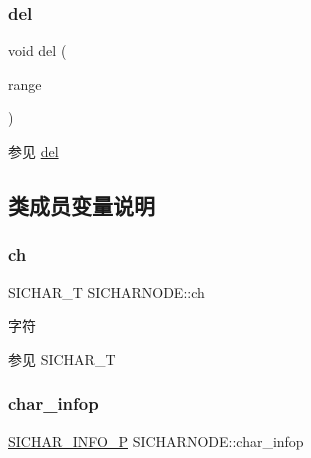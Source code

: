 \subsubsection{\texorpdfstring{del}{del}\hspace{0.1cm}{\footnotesize\ttfamily [3/3]}}
{\footnotesize\ttfamily void del (\begin{DoxyParamCaption}\item[{const \hyperlink{struct_s_i_r_a_n_g_e}{S\+I\+R\+A\+N\+GE} \&}]{range }\end{DoxyParamCaption})\hspace{0.3cm}{\ttfamily [friend]}}

\begin{DoxySeeAlso}{参见}
\hyperlink{class_s_i_c_h_a_r_n_o_d_e_a0a26b116c7c24705ce6e46295c9ff463}{del} 
\end{DoxySeeAlso}


\subsection{类成员变量说明}
\mbox{\label{class_s_i_c_h_a_r_n_o_d_e_a87aabfc0878d7c6cce226256873797e0}} 
\subsubsection{\texorpdfstring{ch}{ch}}
{\footnotesize\ttfamily S\+I\+C\+H\+A\+R\+\_\+T S\+I\+C\+H\+A\+R\+N\+O\+D\+E\+::ch}



字符 

\begin{DoxySeeAlso}{参见}
S\+I\+C\+H\+A\+R\+\_\+T 
\end{DoxySeeAlso}
\mbox{\label{class_s_i_c_h_a_r_n_o_d_e_a03e4b28edd8566a6b605f4caeeb7bd6f}} 
\subsubsection{\texorpdfstring{char\+\_\+infop}{char\_infop}}
{\footnotesize\ttfamily \hyperlink{class_s_i_c_h_a_r___i_n_f_o}{S\+I\+C\+H\+A\+R\+\_\+\+I\+N\+F\+O\+\_\+P} S\+I\+C\+H\+A\+R\+N\+O\+D\+E\+::char\+\_\+infop}



